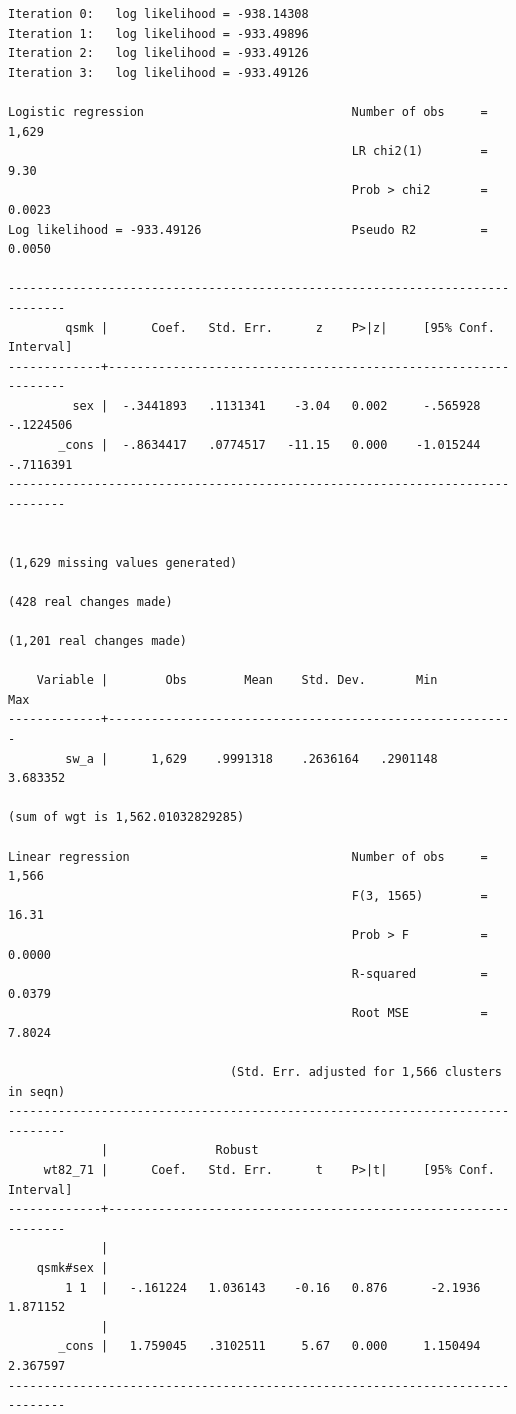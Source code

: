 \documentclass[
  10pt,
]{book}
\begin{document}
\begin{verbatim}
Iteration 0:   log likelihood = -938.14308  
Iteration 1:   log likelihood = -933.49896  
Iteration 2:   log likelihood = -933.49126  
Iteration 3:   log likelihood = -933.49126  

Logistic regression                             Number of obs     =      1,629
                                                LR chi2(1)        =       9.30
                                                Prob > chi2       =     0.0023
Log likelihood = -933.49126                     Pseudo R2         =     0.0050

------------------------------------------------------------------------------
        qsmk |      Coef.   Std. Err.      z    P>|z|     [95% Conf. Interval]
-------------+----------------------------------------------------------------
         sex |  -.3441893   .1131341    -3.04   0.002     -.565928   -.1224506
       _cons |  -.8634417   .0774517   -11.15   0.000    -1.015244   -.7116391
------------------------------------------------------------------------------


(1,629 missing values generated)

(428 real changes made)

(1,201 real changes made)

    Variable |        Obs        Mean    Std. Dev.       Min        Max
-------------+---------------------------------------------------------
        sw_a |      1,629    .9991318    .2636164   .2901148   3.683352

(sum of wgt is 1,562.01032829285)

Linear regression                               Number of obs     =      1,566
                                                F(3, 1565)        =      16.31
                                                Prob > F          =     0.0000
                                                R-squared         =     0.0379
                                                Root MSE          =     7.8024

                               (Std. Err. adjusted for 1,566 clusters in seqn)
------------------------------------------------------------------------------
             |               Robust
     wt82_71 |      Coef.   Std. Err.      t    P>|t|     [95% Conf. Interval]
-------------+----------------------------------------------------------------
             |
    qsmk#sex |
        1 1  |   -.161224   1.036143    -0.16   0.876      -2.1936    1.871152
             |
       _cons |   1.759045   .3102511     5.67   0.000     1.150494    2.367597
------------------------------------------------------------------------------
\end{verbatim}
\end{document}
